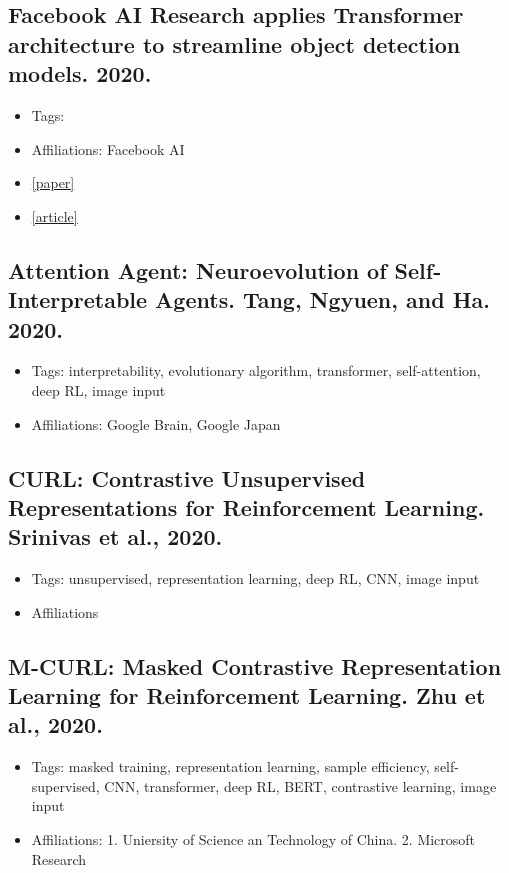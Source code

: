 \subsection{Facebook AI Research applies Transformer architecture to streamline object detection models. 2020.}
\begin{itemize}
	\item Tags:
	\item Affiliations: Facebook AI
	\item \href{https://ai.facebook.com/research/publications/end-to-end-object-detection-with-transformers}{[paper]}
	\item \href{https://venturebeat.com/2020/05/28/facebook-ai-research-applies-transformer-architecture-to-streamline-object-detection-models/}{[article]}  
\end{itemize}

\subsection{Attention Agent: Neuroevolution of Self-Interpretable Agents. Tang, Ngyuen, and Ha. 2020.} 
\begin{itemize}
	\item Tags: interpretability, evolutionary algorithm, transformer, self-attention, deep RL, image input
	\item Affiliations: Google Brain, Google Japan
\end{itemize}



\subsection{CURL: Contrastive Unsupervised Representations for Reinforcement Learning. Srinivas et al., 2020.}
\begin{itemize}
	\item Tags: unsupervised, representation learning, deep RL, CNN, image input
	\item Affiliations
\end{itemize}

\subsection{M-CURL: Masked Contrastive Representation Learning for Reinforcement Learning. Zhu et al., 2020.}
\begin{itemize}
	\item Tags: masked training, representation learning, sample efficiency, self-supervised, CNN, transformer, deep RL, BERT, contrastive learning, image input
	\item Affiliations: 1. Uniersity of Science an Technology of China. 2. Microsoft Research
\end{itemize}

